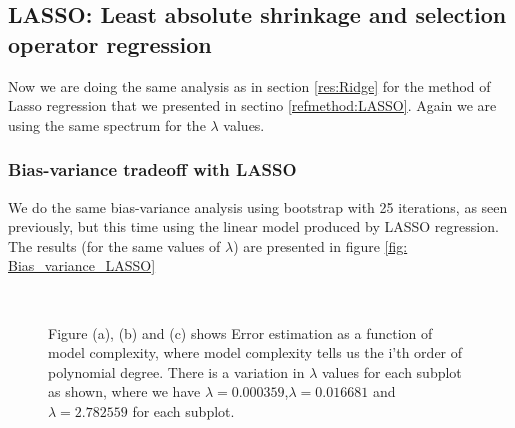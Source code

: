 \documentclass[../main.tex]{subfiles}
\begin{document}
\begin{flushleft}
\newpage
\subsection{LASSO: Least absolute shrinkage and selection operator regression}
Now we are doing the same analysis as in section \eqref{res:Ridge} for the method of Lasso regression that we presented in sectino \eqref{refmethod:LASSO}. Again we are using the same spectrum for the $\lambda$ values.

\subsubsection{Bias-variance tradeoff with LASSO}
We do the same bias-variance analysis using bootstrap with 25 iterations, as seen previously, but this time using the linear model produced by LASSO regression. The results (for the same values of $\lambda$) are presented in figure \eqref{fig: Bias_variance_LASSO}
\begin{figure}[H]
\hspace*{-0.2in}
\\
\hspace*{1.05in}
\caption{Figure (a), (b) and (c) shows Error estimation as a function of model complexity, where model complexity tells us the i'th order of polynomial degree. There is a variation in $\lambda$ values for each subplot as shown, where we have $\lambda = 0.000359$,$\lambda = 0.016681$ and $\lambda = 2.782559$ for each subplot.}
\label{fig: Bias_variance_LASSO}
\end{figure}

\newpage

\end{flushleft}
\end{document}
